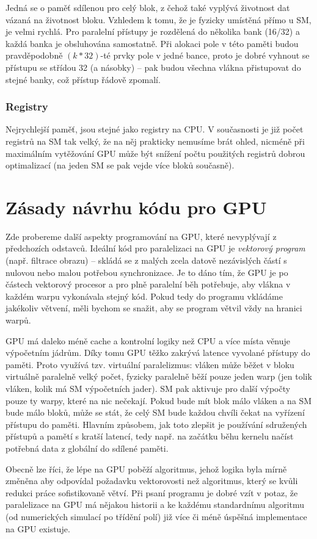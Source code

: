 Jedná se o paměť sdílenou pro celý blok, z čehož také vyplývá životnost dat vázaná na životnost bloku. Vzhledem k tomu, že je fyzicky umístěná přímo u SM, je velmi rychlá. Pro paralelní přístupy je rozdělená do několika bank (16/32) a každá banka je obsluhována samostatně. Při alokaci pole v této paměti budou pravděpodobně $(k*32)$-té prvky pole v jedné bance, proto je dobré vyhnout se přístupu se střídou 32 (a násobky) -- pak budou všechna vlákna přistupovat do stejné banky, což přístup řádově zpomalí.

\subsubsection{Registry}

Nejrychlejší paměť, jsou stejné jako registry na CPU. V současnosti je již počet registrů na SM tak velký, že na něj prakticky nemusíme brát ohled, nicméně při maximálním vytěžování GPU může být snížení počtu použitých registrů dobrou optimalizací (na jeden SM se pak vejde více bloků současně).

\section{Zásady návrhu kódu pro GPU}

Zde probereme další aspekty programování na GPU, které nevyplývají z předchozích odstavců. Ideální kód pro paralelizaci na GPU je \emph{vektorový program} (např. filtrace obrazu) -- skládá se z malých zcela datově nezávislých částí s nulovou nebo malou potřebou synchronizace. Je to dáno tím, že GPU je po částech vektorový procesor a pro plně paralelní běh potřebuje, aby vlákna v každém warpu vykonávala stejný kód. Pokud tedy do programu vkládáme jakékoliv větvení, měli bychom se snažit, aby se program větvil vždy na hranici warpů.

GPU má daleko méně cache a kontrolní logiky než CPU a více místa věnuje výpočetním jádrům. Díky tomu GPU těžko zakrývá latence vyvolané přístupy do paměti. Proto využívá tzv. virtuální paralelizmus: vláken může běžet v bloku virtuálně paralelně velký počet, fyzicky paralelně běží pouze jeden warp (jen tolik vláken, kolik má SM výpočetních jader). SM pak aktivuje pro další výpočty pouze ty warpy, které na nic nečekají. Pokud bude mít blok málo vláken a na SM bude málo bloků, může se stát, že celý SM bude každou chvíli čekat na vyřízení přístupu do paměti. Hlavním způsobem, jak toto zlepšit je používání sdružených přístupů a pamětí s kratší latencí, tedy např. na začátku běhu kernelu načíst potřebná data z globální do sdílené paměti.

Obecně lze říci, že lépe na GPU poběží algoritmus, jehož logika byla mírně změněna aby odpovídal požadavku vektorovosti než algoritmus, který se kvůli redukci práce sofistikovaně větví. Při psaní programu je dobré vzít v potaz, že paralelizace na GPU má nějakou historii a ke každému standardnímu algoritmu (od numerických simulací po třídění polí) již více či méně úspěšná implementace na GPU existuje.
